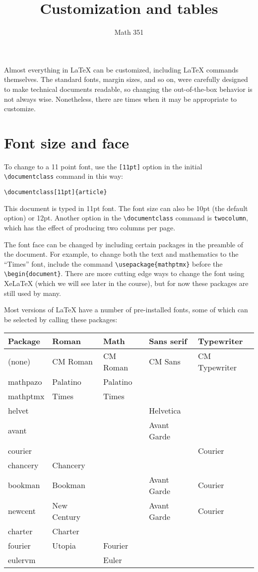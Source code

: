 \documentclass[11pt]{article}
\title{Customization and tables}
\author{Math 351}
\date{}
\begin{document}
\maketitle

Almost everything in \LaTeX{} can be customized, including \LaTeX{} commands
themselves.  The standard fonts, margin sizes, and so on, were carefully designed to 
make technical documents readable, so changing the out-of-the-box behavior is not 
always wise.  Nonetheless, there are times when it may be appropriate to customize.

\section{Font size and face}

To change to a 11 point font, use the \verb~[11pt]~ option in the initial 
\verb~\documentclass~ command in this way:
\begin{verbatim}
\documentclass[11pt]{article}
\end{verbatim}
This document is typed in 11pt font.  The font size can also be 10pt (the default 
option) or 12pt.  Another option in the \verb~\documentclass~ command is 
\verb~twocolumn~, which has the effect of producing two columns per page.  

The font face can be changed by including certain packages in the preamble of the 
document.  For example, to change both the text and mathematics to the ``Times'' font, 
include the command \verb~\usepackage{mathptmx}~ before the \verb~\begin{document}~.
There are more cutting edge ways to change the font using XeLaTeX (which we will see later in the 
course), but for now these packages are still used by many. 


Most versions of \LaTeX{} have a number of pre-installed fonts, some of which can be 
selected by calling these packages:
\begin{center}
\begin{tabular}{|lllll|}
\hline
\textbf{Package} & \textbf{Roman} & \textbf{Math} & \textbf{Sans serif} & \textbf{Typewriter} \\
\hline
\hline	
(none) &  CM Roman &  CM Roman & CM Sans  & CM Typewriter \\	
mathpazo &  Palatino &  Palatino &  &  \\
mathptmx &  Times &  Times &  &  \\
helvet &  &  &  Helvetica&  \\
avant &  &  &  Avant Garde &  \\
courier  &  &  &  &  Courier  \\
chancery &  Chancery  &  &  &  \\
bookman  &  Bookman  &  &  Avant Garde &  Courier  \\
newcent  &  New Century  &  &  Avant Garde &  Courier  \\
charter  &  Charter  &  &  &  \\
\hline
fourier  &  Utopia&  Fourier  &  &  \\
eulervm  &  &  Euler &  &  \\ 
\hline
\end{tabular}
\end{center}
\end{document}
